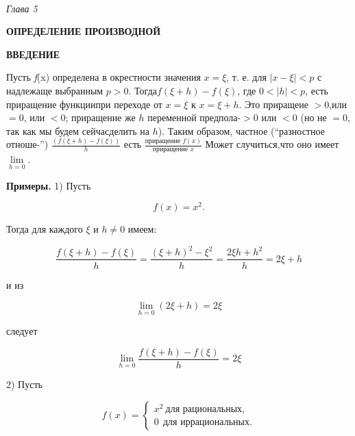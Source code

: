 \documentclass[12pt,cmcyralt]{book} %
\begin{document}
\pagestyle{empty}
\begin{center}
\ 

\vspace{40pt}
{\it Г\hspace{4 pt}л\hspace{4 pt}а\hspace{4 pt}в\hspace{4 pt}а\hspace{4 pt} \hspace{4 pt}5}

\vspace{12pt}
{\large\textbf{ОПРЕДЕЛЕНИЕ ПРОИЗВОДНОЙ}}

\vspace{12pt}
\textbf{ВВЕДЕНИЕ}

\end{center}
Пусть {\it f}(x) определена в окрестности значения $ x = \xi $, \linebreak т. е. для $|x - \xi | < p$ с надлежаще выбранным $p > 0$. Тогда\linebreak $f(\xi + h) - f(\xi)$, где $0 < |h| < p$, есть приращение функции\linebreak при переходе от $x = \xi$ к $x = \xi + h$. Это приращеие $> 0$,\linebreak или $= 0$, или $< 0$; приращение же $h$ переменной предпола- $> 0$ или $< 0$ (но не $= 0$, так как мы будем сейчас\linebreak делить на $h$). Таким образом, частное ("`разностное отноше-"')  $\frac{(f(\xi + h)-f(\xi))}{h}$ есть $\frac{\text{приращение \ } f(x)}{\text{приращение \ }x}$ Может случиться,\linebreak что оно имеет $\lim\limits_{h = 0}$.

\textbf{Примеры.} 1) Пусть

$$f(x) = x^2.$$

\noindent Тогда для каждого $\xi$ и $h \neq 0$ имеем:

$$\frac{f(\xi + h)-f(\xi)}{h} = \frac{(\xi+h)^2-\xi^2}{h}=\frac{2\xi h + h^2}{h}=2\xi + h$$

\noindent и из

$$\lim_{h=0}(2\xi+h) = 2\xi$$

\noindent следует 

$$\lim_{h=0} \frac{f(\xi + h)-f(\xi)}{h} = 2\xi$$

2) Пусть

$$f(x) =
\begin{cases} 
x^2 \  \text{для рациональных,}\\
0 \ \ \text{для иррациональных.}
\end{cases}
$$
\end{document}
